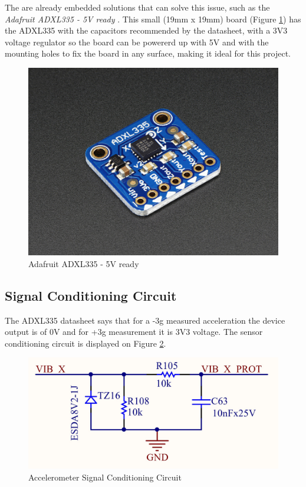 	The are already embedded solutions that can solve this issue, such as the \textit{Adafruit ADXL335 - 5V ready} \cite{adafruit-5v-ready}. This small (19mm x 19mm) board (Figure \ref{fig:adafruit-adxl335}) has the ADXL335 with the capacitors recommended by the datasheet, with a 3V3 voltage regulator so the board can be powererd up with 5V and with the mounting holes to fix the board in any surface, making it ideal for this project.

	\begin{figure}[htbp]
		\centering
		\includegraphics[width=.5\textwidth]{figuras/fig-adafruit-adxl335.jpg}
		\caption{Adafruit ADXL335 - 5V ready \cite{adafruit-adxl335}}
		\label{fig:adafruit-adxl335}
	\end{figure}


\subsection{Signal Conditioning Circuit}\label{ssec:accelerometer-signal-conditioning-circuit}

	The ADXL335 datasheet \cite{devices2010adxl335} says that for a -3g measured acceleration the device output is of 0V and for +3g measurement it is 3V3 voltage. The sensor conditioning circuit is displayed on Figure \ref{fig:accelerometer-signal-conditioning-circuit}.

	\begin{figure}[htbp]
		\centering
		\includegraphics[width=.8\textwidth]{figuras/fig-accelerometer-signal-conditioning-circuit}
		\caption{Accelerometer Signal Conditioning Circuit}
		\label{fig:accelerometer-signal-conditioning-circuit}
	\end{figure}



